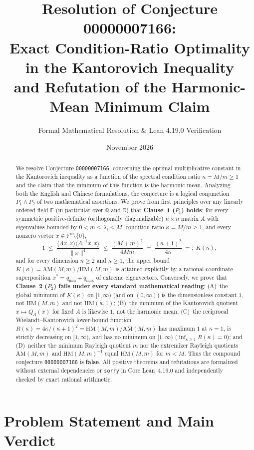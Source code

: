 \documentclass[11pt,a4paper]{article}
\title{\textbf{Resolution of Conjecture 00000007166:\\
Exact Condition-Ratio Optimality in the Kantorovich Inequality\\
and Refutation of the Harmonic-Mean Minimum Claim}}
\author{Formal Mathematical Resolution \& Lean 4.19.0 Verification}
\date{November 2026}
\theoremstyle{definition}
\newcommand{\AM}{\mathrm{AM}}
\newcommand{\HM}{\mathrm{HM}}
\begin{document}
\maketitle

\begin{abstract}
We resolve Conjecture \texttt{00000007166}, concerning the optimal multiplicative
constant in the Kantorovich inequality as a function of the spectral condition
ratio $\kappa = M/m \ge 1$ and the claim that the minimum of this function is the
harmonic mean. Analyzing both the English and Chinese formulations, the
conjecture is a logical conjunction $P_1 \land P_2$ of two mathematical
assertions. We prove from first principles over any linearly ordered field
$\mathbb{F}$ (in particular over $\mathbb{Q}$ and $\mathbb{R}$) that
\textbf{Clause~1 ($P_1$) holds}: for every symmetric positive-definite (orthogonally
diagonalizable) $n \times n$ matrix $A$ with eigenvalues bounded by
$0 < m \le \lambda_i \le M$, condition ratio $\kappa = M/m \ge 1$, and every
nonzero vector $x \in \mathbb{F}^n \setminus \{0\}$,
\[
  1 \;\le\; \frac{\langle Ax, x\rangle \langle A^{-1}x, x\rangle}{\|x\|^4}
  \;\le\; \frac{(M + m)^2}{4Mm} \;=\; \frac{(\kappa + 1)^2}{4\kappa} \;=:\; K(\kappa),
\]
and for every dimension $n \ge 2$ and $\kappa \ge 1$, the upper bound
$K(\kappa) = \AM(M,m)/\HM(M,m)$ is attained explicitly by a rational-coordinate
superposition $x^* = q_{\min} + q_{\max}$ of extreme eigenvectors. Conversely, we
prove that \textbf{Clause~2 ($P_2$) fails under every standard mathematical
reading}: (A)~the global minimum of $K(\kappa)$ on $[1,\infty)$ (and on
$(0,\infty)$) is the dimensionless constant $1$, not $\HM(M,m)$ and not
$\HM(\kappa,1)$; (B)~the minimum of the Kantorovich quotient $x \mapsto Q_A(x)$
for fixed $A$ is likewise $1$, not the harmonic mean; (C)~the reciprocal
Wielandt--Kantorovich lower-bound function $R(\kappa) = 4\kappa/(\kappa+1)^2 =
\HM(M,m)/\AM(M,m)$ has maximum $1$ at $\kappa=1$, is strictly decreasing on
$[1,\infty)$, and has no minimum on $[1,\infty)$ ($\inf_{\kappa \ge 1} R(\kappa)=0$);
and (D)~neither the minimum Rayleigh quotient $m$ nor the extremizer Rayleigh
quotients $\AM(M,m)$ and $\HM(M,m)^{-1}$ equal $\HM(M,m)$ for $m < M$. Thus the
compound conjecture \texttt{00000007166} is \textbf{false}. All positive theorems
and refutations are formalized without external dependencies or \texttt{sorry} in
Core Lean~4.19.0 and independently checked by exact rational arithmetic.
\end{abstract}

\section{Problem Statement and Main Verdict}
\end{document}
